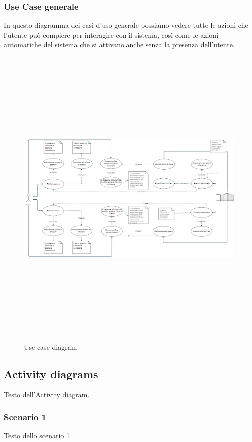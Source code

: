 \documentclass[12pt]{article}
\begin{document}
\newpage
\subsubsection{Use Case generale}
In questo diagramma dei casi d'uso generale possiamo vedere tutte le azioni che l'utente può compiere per interagire con il sistema, così come le azioni automatiche del sistema che si attivano anche senza la presenza dell'utente.
\begin{figure}[h] %
    \centering %
    \includegraphics[width=1.1\textwidth, height=15cm, angle=270]{usa_case_diagram.PNG} %
    \caption{Use case diagram} %
    \label{fig:immagine} %
\end{figure}

\newpage
\subsection{Activity diagrams}
Testo dell'Activity diagram.
\subsubsection{Scenario 1}
Testo dello scenario 1
\end{document}
